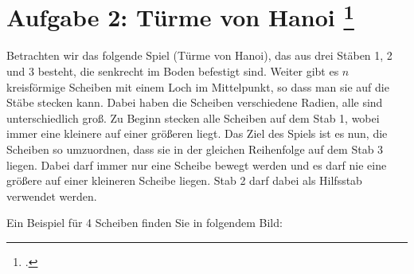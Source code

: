 \documentclass{lehramt-informatik-aufgabe}
\begin{document}

\section{Aufgabe 2: Türme von Hanoi
\footcite{aud:ab:7}}

Betrachten wir das folgende Spiel (Türme von Hanoi), das aus drei Stäben
1, 2 und 3 besteht, die senkrecht im Boden befestigt sind. Weiter gibt
es $n$ kreisförmige Scheiben mit einem Loch im Mittelpunkt, so dass man
sie auf die Stäbe stecken kann. Dabei haben die Scheiben verschiedene
Radien, alle sind unterschiedlich groß. Zu Beginn stecken alle Scheiben
auf dem Stab 1, wobei immer eine kleinere auf einer größeren liegt. Das
Ziel des Spiels ist es nun, die Scheiben so umzuordnen, dass sie in der
gleichen Reihenfolge auf dem Stab 3 liegen. Dabei darf immer nur eine
Scheibe bewegt werden und es darf nie eine größere auf einer kleineren
Scheibe liegen. Stab 2 darf dabei als Hilfsstab verwendet werden.

Ein Beispiel für 4 Scheiben finden Sie in folgendem Bild:

\begin{center}
\end{center}

\begin{center}
\end{center}
\end{document}
